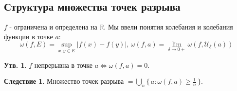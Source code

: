 \documentclass[12pt]{article}
\theoremstyle{definition}
\newtheorem{prop}{Утв.}
\newtheorem{corollary}{Следствие}
\begin{document}

\subsection*{Структура множества точек разрыва}

$f$ - ограничена и определена на $\mathbb{R}$. Мы ввели понятия колебания и колебания функции в точке $a$:
$$\omega(f,E) = \sup\limits_{x,y \in E}|f(x) - f(y)|, \, \omega(f,a) = \lim\limits_{\delta \to 0+} \omega(f,\mathcal{U}_\delta(a))$$ 

\begin{prop}
	$f$ непрерывна в точке $a \Leftrightarrow \omega(f,a) = 0$.
\end{prop}	

\begin{corollary}
	Множество точек разрыва $ = \bigcup\limits_{n}\{\,a \colon \omega(f,a) \geq \frac{1}{n} \,\}$.
\end{corollary}
\end{document}
